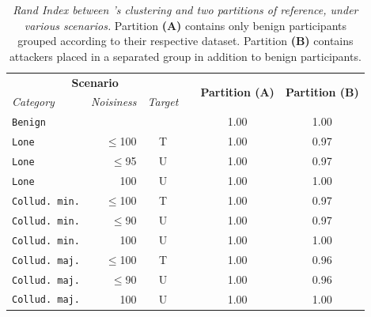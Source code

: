\begin{table}
  \centering
  \caption{
    \emph{Rand Index between \thecontrib's clustering and two partitions of reference, under various scenarios.} 
    Partition \textbf{(A)} contains only benign participants grouped according to their respective dataset. 
    Partition \textbf{(B)} contains attackers placed in a separated group in addition to benign participants. 
    \label{tbl:radar.rand_clustering}
  }

  \setlength\tabcolsep{0.8ex}
  \begin{tabular}{lrcccc}
    \toprule
    \multicolumn{3}{c}{\textbf{Scenario}} && \multirow{2}{*}{\textbf{Partition (A)}} & \multirow{2}{*}{\textbf{Partition (B)}} \\
    \textit{Category} & \textit{Noisiness} & \textit{Target} && & \\
    \midrule %
    \texttt{Benign} & & && 1.00 & 1.00 \\ 
    
    \midrule[.1pt] %
    \texttt{Lone } & $\le$100 & T && 1.00 & 0.97 \\
    \texttt{Lone} & $\le$95 & U && 1.00 & 0.97 \\
    \texttt{Lone} & 100 & U  && 1.00 & 1.00 \\  
    
    \midrule[.1pt] %
    \texttt{Collud. min.} & $\le$100 & T && 1.00 & 0.97 \\
    \texttt{Collud. min.} & $\le$90 & U && 1.00 & 0.97 \\
    \texttt{Collud. min.} & 100 & U && 1.00 & 1.00 \\

    \midrule[.005em] %
    \texttt{Collud. maj.} & $\le$100 & T && 1.00 & 0.96 \\
    \texttt{Collud. maj.} & $\le$90 & U && 1.00 & 0.96 \\
    \texttt{Collud. maj.} & 100 & U && 1.00  & 1.00 \\
    \bottomrule %
  \end{tabular}
\end{table}

